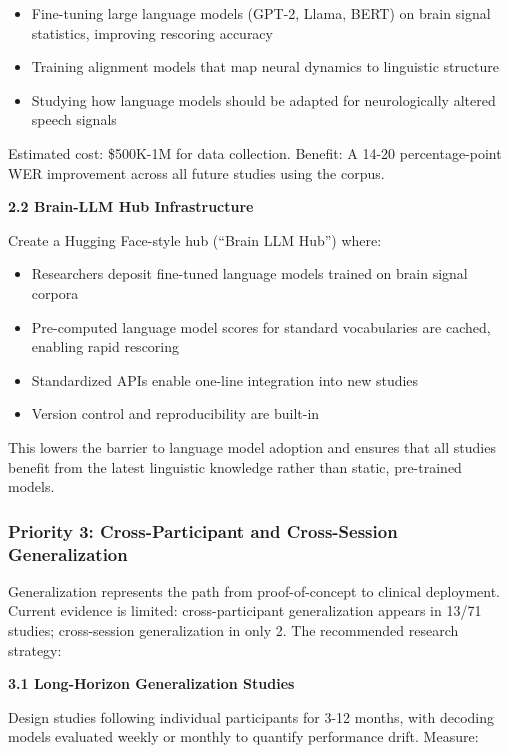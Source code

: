 \begin{itemize}
    \item Fine-tuning large language models (GPT-2, Llama, BERT) on brain signal statistics, improving rescoring accuracy
    \item Training alignment models that map neural dynamics to linguistic structure
    \item Studying how language models should be adapted for neurologically altered speech signals
\end{itemize}

Estimated cost: \$500K-1M for data collection. Benefit: A 14-20 percentage-point WER improvement across all future studies using the corpus.

\textbf{2.2 Brain-LLM Hub Infrastructure}

Create a Hugging Face-style hub (``Brain LLM Hub'') where:

\begin{itemize}
    \item Researchers deposit fine-tuned language models trained on brain signal corpora
    \item Pre-computed language model scores for standard vocabularies are cached, enabling rapid rescoring
    \item Standardized APIs enable one-line integration into new studies
    \item Version control and reproducibility are built-in
\end{itemize}

This lowers the barrier to language model adoption and ensures that all studies benefit from the latest linguistic knowledge rather than static, pre-trained models.

\subsubsection{Priority 3: Cross-Participant and Cross-Session Generalization}

Generalization represents the path from proof-of-concept to clinical deployment. Current evidence is limited: cross-participant generalization appears in 13/71 studies; cross-session generalization in only 2. The recommended research strategy:

\textbf{3.1 Long-Horizon Generalization Studies}

Design studies following individual participants for 3-12 months, with decoding models evaluated weekly or monthly to quantify performance drift. Measure:

